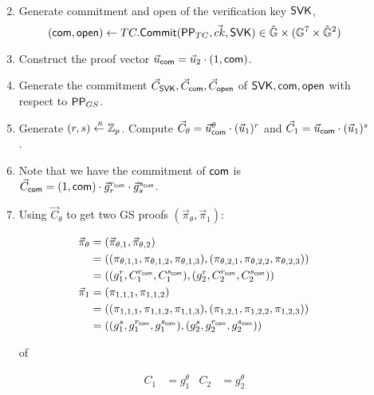 \begin{description}
\begin{enumerate}
\begin{align*}
    \end{align*}
  \item Generate commitment and open of the verification key $\mathsf{SVK}$, 
    $$(\mathsf{com}, \mathsf{open}) \gets TC.{\mathsf{Commit}}(\mathsf{PP}_{TC}, \vec{ck}, \mathsf{SVK}) \in \hat{\mathbb{G}} \times (\mathbb{G}^7 \times \hat{\mathbb{G}}^2)$$
  \item Construct the proof vector $\vec{u}_{\mathsf{com}} = \vec{u}_2\cdot (1, \mathsf{com})$.
  \item Generate the commitment $\vec{C}_{\mathsf{SVK}}, \vec{C}_{\mathsf{com}}, \vec{C}_{\mathsf{open}}$ of $\mathsf{SVK}, \mathsf{com}, \mathsf{open}$ with respect to $\mathsf{PP}_{GS}$.
  \item Generate $(r,s) \stackrel{{\scriptscriptstyle \mkern4mu R}}{\gets} \mathbb{Z}_p$. Compute $\vec{C}_{\theta} = \vec{u}_{\mathsf{com}}^{\theta} \cdot (\vec{u}_1)^r$ and $\vec{C}_{1} = \vec{u}_{\mathsf{com}} \cdot (\vec{u}_1)^s$.
  \item Note that we have the commitment of $\mathsf{com}$ is $\vec{C}_{\mathsf{com}} = (1, \mathsf{com}) \cdot \vec{g}_r^{r_{\mathsf{com}}} \cdot \vec{g}_s^{s_{\mathsf{com}}}$.
  \item Using $\vec{C}_{\theta}$ to get two GS proofs $(\vec{\pi}_{\theta}, \vec{\pi}_1)$:

    \begin{align*}
      \vec{\pi}_{\theta} &= (\vec{\pi}_{\theta,1}, \vec{\pi}_{\theta,2})\\
      &= ((\pi_{\theta,1,1}, \pi_{\theta,1,2}, \pi_{\theta,1,3}), (\pi_{\theta,2,1}, \pi_{\theta,2,2}, \pi_{\theta,2,3}))\\
      &= ((g_1^r, C_1^{r_{\mathsf{com}}}, C_1^{s_{\mathsf{com}}}),(g_2^r, C_2^{r_{\mathsf{com}}}, C_2^{s_{\mathsf{com}}}))\\     
      \vec{\pi}_{1} &= (\pi_{1,1,1}, \pi_{1,1,2})\\
      &= ((\pi_{1,1,1}, \pi_{1,1,2}, \pi_{1,1,3}), (\pi_{1,2,1}, \pi_{1,2,2}, \pi_{1,2,3}))\\
      &= ((g_1^s, g_1^{r_{\mathsf{com}}}, g_1^{s_{\mathsf{com}}}),(g_2^s, g_2^{r_{\mathsf{com}}}, g_2^{s_{\mathsf{com}}}))
    \end{align*}

    of
    
    \begin{align*}
      C_1 &= g_1^{\theta} & C_2 &= g_2^{\theta}
    \end{align*}


\end{enumerate}
\end{description}
